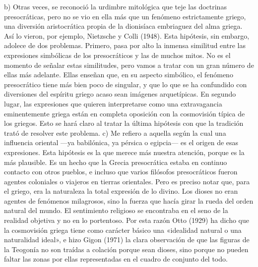\documentclass[a4paper]{article}
\begin{document}
b) Otras veces,
se reconoció la urdimbre mitológica que teje las doctrinas presocráticas, pero
no se vio en ella más que un fenómeno estrictamente griego, una diversión
aristocrática propia de la dionisíaca embriaguez del alma griega. Así lo vieron,
por ejemplo, Nietzsche y Colli (1948). Esta hipótesis, sin embargo, adolece de
dos problemas. Primero, pasa por alto la inmensa similitud entre las expresiones
simbólicas de los presocráticos y las de muchos mitos. No es el momento de
señalar estas similitudes, pero vamos a tratar con un gran número de ellas más
adelante. Ellas enseñan que, en su aspecto simbólico, el fenómeno presocrático
tiene más bien poco de singular, y que lo que se ha confundido con diversiones
del espíritu griego acaso sean imágenes arquetípicas. En segundo lugar, las
expresiones que quieren interpretarse como una extravagancia eminentemente
griega están en completa oposición con la cosmovisión típica de los griegos.
Esto se hará claro al tratar la última hipótesis con que la tradición trató de
resolver este problema. c) Me refiero a aquella según la cual una influencia
oriental —ya babilónica, ya pérsica o egipcia— es el origen de esas expresiones.
Esta hipótesis es la que merece más nuestra atención, porque es la más
plausible. Es un hecho que la Grecia presocrática estaba en continuo contacto
con otros pueblos, e incluso que varios filósofos presocráticos fueron agentes
coloniales o viajeros en tierras orientales. Pero es preciso notar que, para el
griego, era la naturaleza la total expresión de lo divino. Los dioses no eran
agentes de fenómenos milagrosos, sino la fuerza que hacía girar la rueda del
orden natural del mundo. El sentimiento religioso se encontraba en el seno de la
realidad objetiva y no en lo portentoso. Por esta razón Otto (1929) ha dicho que
la cosmovisión griega tiene como carácter básico una «idealidad natural o una
naturalidad ideal», e hizo Gigon (1971) la clara observación de que las figuras
de la Teogonía no son traídas a colación porque sean dioses, sino porque no
pueden faltar las zonas por ellas representadas en el cuadro de conjunto del
todo.
\end{document}
